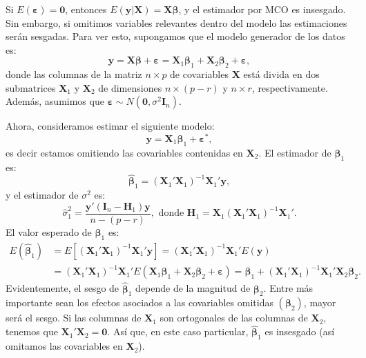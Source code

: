 \documentclass[
]{article}
\begin{document}
Si \(E(\boldsymbol \varepsilon) = \boldsymbol 0\), entonces \(E(\boldsymbol y| \boldsymbol X) = \boldsymbol X\boldsymbol \beta\), y el estimador por MCO es insesgado. Sin embargo, si omitimos variables relevantes dentro del modelo las estimaciones serán sesgadas. Para ver esto, supongamos que el modelo generador de los datos es:
\[
\boldsymbol y= \boldsymbol X\boldsymbol \beta+ \boldsymbol \varepsilon=  \boldsymbol X_{1}\boldsymbol \beta_{1} + \boldsymbol X_{2}\boldsymbol \beta_{2} + \boldsymbol \varepsilon,
\]
donde las columnas de la matriz \(n\times p\) de covariables \(\boldsymbol X\) está divida en dos submatrices \(\boldsymbol X_{1}\) y \(\boldsymbol X_{2}\) de dimensiones \(n \times (p-r)\) y \(n\times r\), respectivamente. Además, asumimos que \(\boldsymbol \varepsilon\sim N(\boldsymbol 0, \sigma^{2}\boldsymbol I_{n})\).

Ahora, consideramos estimar el siguiente modelo:
\[
\boldsymbol y= \boldsymbol X_{1}\boldsymbol \beta_{1} + \boldsymbol \varepsilon^{*},
\]
es decir estamos omitiendo las covariables contenidas en \(\boldsymbol X_{2}\). El estimador de \(\boldsymbol \beta_{1}\) es:
\[
\widehat{\boldsymbol \beta}_{1} = (\boldsymbol X_{1}'\boldsymbol X_{1})^{-1}\boldsymbol X_{1}'\boldsymbol y,
\]
y el estimador de \(\sigma^{2}\) es:
\[
\widehat{\sigma}^{2}_{1} = \frac{\boldsymbol y'(\boldsymbol I_{n} - \boldsymbol H_{1})\boldsymbol y}{n-(p-r)}, \mbox{ donde }\boldsymbol H_{1} = \boldsymbol X_{1}(\boldsymbol X_{1}'\boldsymbol X_{1})^{-1}\boldsymbol X_{1}'.
\]
El valor esperado de \(\widehat{\boldsymbol \beta}_{1}\) es:
\begin{equation}
\begin{split}
E(\widehat{\boldsymbol \beta}_{1}) &= E\left[(\boldsymbol X_{1}'\boldsymbol X_{1})^{-1}\boldsymbol X_{1}'\boldsymbol y\right] = (\boldsymbol X_{1}'\boldsymbol X_{1})^{-1}\boldsymbol X_{1}'E(\boldsymbol y) \\
&= (\boldsymbol X_{1}'\boldsymbol X_{1})^{-1}\boldsymbol X_{1}'E(\boldsymbol X_{1}\boldsymbol \beta_{1} + \boldsymbol X_{2}\boldsymbol \beta_{2} + \boldsymbol \varepsilon) = \boldsymbol \beta_{1} +  (\boldsymbol X_{1}'\boldsymbol X_{1})^{-1}\boldsymbol X_{1}'\boldsymbol X_{2}\boldsymbol \beta_{2}.
\end{split}
\nonumber
\end{equation}
Evidentemente, el sesgo de \(\widehat{\boldsymbol \beta}_{1}\) depende de la magnitud de \(\boldsymbol \beta_{2}\). Entre más importante sean los efectos asociados a las covariables omitidas \((\boldsymbol \beta_{2})\), mayor será el sesgo. Si las columnas de \(\boldsymbol X_{1}\) son ortogonales de las columnas de \(\boldsymbol X_{2}\), tenemos que \(\boldsymbol X_{1}'\boldsymbol X_{2} = \boldsymbol 0\). Así que, en este caso particular, \(\widehat{\boldsymbol \beta}_{1}\) es insesgado (así omitamos las covariables en \(\boldsymbol X_{2}\)).
\end{document}
